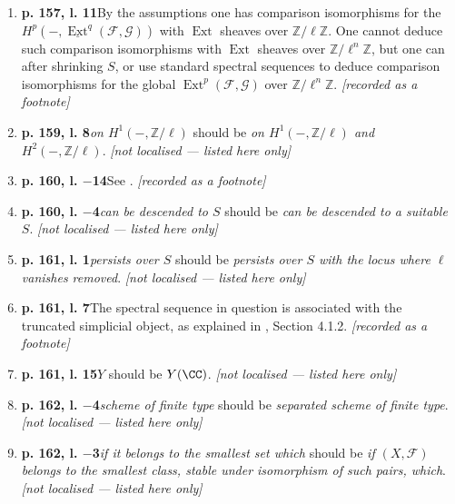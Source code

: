 \documentclass[12pt,oneside]{amsbook}
\theoremstyle{plain}
\theoremstyle{definition}
\newcommand{\FF}{\mathcal{F}}
\newcommand{\GG}{\mathcal{G}}
\newcommand{\ZZ}{\mathbb{Z}}  \newcommand{\QQ}{\mathbb{Q}}
\DeclareMathOperator{\Ext}{Ext}
\begin{document}
\begin{enumerate}[label={\arabic*.},leftmargin=2.6em,itemsep=4pt]
\item \textbf{p. 157, l. 11}\quad By the assumptions one has comparison isomorphisms for the $H^{p}(-,\underline{\Ext}^{q}(\FF,\GG))$ with $\Ext$ sheaves over $\ZZ/\ell\ZZ$. One cannot deduce such comparison isomorphisms with $\Ext$ sheaves over $\ZZ/\ell^{n}\ZZ$, but one can after shrinking $S$, or use standard spectral sequences to deduce comparison isomorphisms for the global $\Ext^{p}(\FF,\GG)$ over $\ZZ/\ell^{n}\ZZ$. \hfill\newline \textsl{[recorded as a footnote]}
\item \textbf{p. 159, l. 8}\quad \emph{on $H^{1}(-,\ZZ/\ell)$} should be \emph{on $H^{1}(-,\ZZ/\ell)$ and $H^{2}(-,\ZZ/\ell)$}. \hfill\newline \textsl{[not localised --- listed here only]}
\item \textbf{p. 160, l. $-$14}\quad See \cite{Ham95}. \hfill\newline \textsl{[recorded as a footnote]}
\item \textbf{p. 160, l. $-$4}\quad \emph{can be descended to $S$} should be \emph{can be descended to a suitable $S$}. \hfill\newline \textsl{[not localised --- listed here only]}
\item \textbf{p. 161, l. 1}\quad \emph{persists over $S$} should be \emph{persists over $S$ with the locus where $\ell$ vanishes removed}. \hfill\newline \textsl{[not localised --- listed here only]}
\item \textbf{p. 161, l. 7}\quad The spectral sequence in question is associated with the truncated simplicial object, as explained in \cite{MO15}, Section 4.1.2. \hfill\newline \textsl{[recorded as a footnote]}
\item \textbf{p. 161, l. 15}\quad $Y$ should be $Y(\CC)$. \hfill\newline \textsl{[not localised --- listed here only]}
\item \textbf{p. 162, l. $-$4}\quad \emph{scheme of finite type} should be \emph{separated scheme of finite type}. \hfill\newline \textsl{[not localised --- listed here only]}
\item \textbf{p. 162, l. $-$3}\quad \emph{if it belongs to the smallest set which} should be \emph{if $(X,\FF)$ belongs to the smallest class, stable under isomorphism of such pairs, which}. \hfill\newline \textsl{[not localised --- listed here only]}

\end{enumerate}
\end{document}
